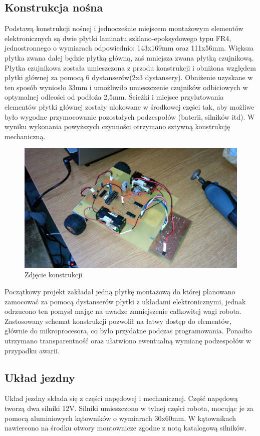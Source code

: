 \documentclass[11pt,a4paper]{article}
\begin{document}
  \subsection{Konstrukcja nośna}
  Podstawą konstrukcji nośnej i jednocześnie miejscem montażowym elementów elektronicznych są dwie płytki laminatu szklano-epoksydowego typu FR4, jednostronnego o wymiarach odpowiednio: 143x169mm oraz 111x56mm. Większa płytka zwana dalej będzie płytką główną, zaś mniejsza zwana płytką czujnikową.   Płytka czujnikowa została umieszczona z przodu konstrukcji i obniżona względem płytki głównej za pomocą 6 dystanserów(2x3 dystansery).
  Obniżenie uzyskane w ten sposób wyniosło 33mm i umożliwiło umieszczenie czujników odbiciowych w optymalnej odleości od podłoża 2,5mm.
  Ścieżki i miejsce przylutowania elementów płytki głównej zostały ulokowane w środkowej części tak, aby możliwe było wygodne przymocowanie pozostałych podzespołów (baterii, silników itd).
  W wyniku wykonania powyższych czynności otrzymano sztywną konstrukcję mechaniczną.
  \begin{figure}
    \includegraphics[scale=0.48]{zubron_main}
    \caption{Zdjęcie konstrukcji}
  \end{figure}
  Początkowy projekt zakładał jedną płytkę montażową do której planowano zamocować za pomocą dystanserów płytki z układami elektronicznymi, jednak odrzucono ten pomysł mając na uwadze zmniejszenie całkowitej wagi robota. Zastosowany schemat konstrukcji pozwolił na łatwy dostęp do elementów, głównie do mikroprocesora, co było przydatne podczas programowania. Ponadto utrzymano transparentność oraz ułatwiono ewentualną wymianę podzespołów w przypadku awarii.
  \subsection{Układ jezdny}
  Układ jezdny składa się z części napędowej i mechanicznej. Część napędową tworzą dwa silniki 12V. Silniki umieszczono w tylnej części robota, mocując je za pomocą aluminiowych kątowników o wymiarach 30x60mm. W kątownikach nawiercono na środku otwory montownicze zgodne z notą katalogową silników.
  
\end{document}
